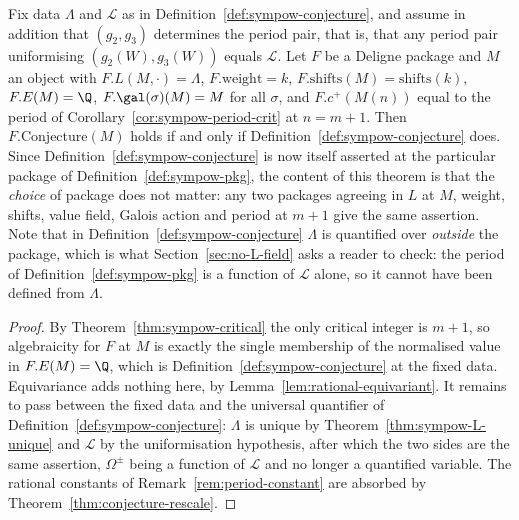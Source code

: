\begin{theorem}
  \label{thm:sympow-framework}
  Fix data $\Lambda$ and $\mathcal{L}$ as in Definition~\ref{def:sympow-conjecture}, and assume
  in addition that $(g_{2},g_{3})$ determines the period pair, that is, that any period pair
  uniformising $(g_{2}(W),g_{3}(W))$ equals $\mathcal{L}$. Let $F$ be a Deligne package and
  $M$ an object with $F.L(M,\cdot) = \Lambda$, $F.\mathrm{weight}=k$,
  $F.\mathrm{shifts}(M) = \mathrm{shifts}(k)$, $F.E(M) = \Q$, $F.\gal(\sigma)(M)=M$ for all
  $\sigma$, and $F.c^{+}(M(n))$ equal to the period of
  Corollary~\ref{cor:sympow-period-crit} at $n = m+1$. Then $F.\mathrm{Conjecture}(M)$
  holds if and only if Definition~\ref{def:sympow-conjecture} does. Since
  Definition~\ref{def:sympow-conjecture} is now itself asserted at the particular package of
  Definition~\ref{def:sympow-pkg}, the content of this theorem is that the \emph{choice} of
  package does not matter: any two packages agreeing in $L$ at $M$, weight, shifts, value
  field, Galois action and period at $m+1$ give the same assertion. Note that in
  Definition~\ref{def:sympow-conjecture} $\Lambda$ is quantified over \emph{outside} the
  package, which is what Section~\ref{sec:no-L-field} asks a reader to check: the period of
  Definition~\ref{def:sympow-pkg} is a function of $\mathcal{L}$ alone, so it cannot have been
  defined from $\Lambda$.
\end{theorem}
\begin{proof}
  By Theorem~\ref{thm:sympow-critical} the only critical integer is $m+1$, so algebraicity for
  $F$ at $M$ is exactly the single membership of the normalised value in $F.E(M)=\Q$, which is
  Definition~\ref{def:sympow-conjecture} at the fixed data. Equivariance adds nothing here, by
  Lemma~\ref{lem:rational-equivariant}. It remains to pass between the fixed data and the
  universal quantifier of Definition~\ref{def:sympow-conjecture}: $\Lambda$ is unique by
  Theorem~\ref{thm:sympow-L-unique} and $\mathcal{L}$ by the uniformisation hypothesis, after
  which the two sides are the same assertion, $\Omega^{\pm}$ being a function of $\mathcal{L}$
  and no longer a quantified variable. The rational constants of
  Remark~\ref{rem:period-constant} are absorbed by Theorem~\ref{thm:conjecture-rescale}.
\end{proof}

